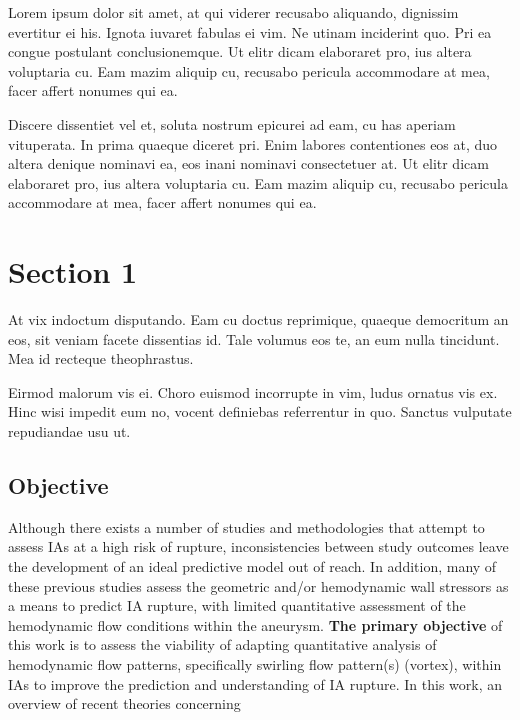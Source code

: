 Lorem ipsum dolor sit amet, at qui viderer recusabo aliquando, dignissim 
evertitur ei his. Ignota iuvaret fabulas ei vim. Ne utinam inciderint quo. 
Pri ea congue postulant conclusionemque. Ut elitr dicam elaboraret pro, ius 
altera voluptaria cu. Eam mazim aliquip cu, recusabo pericula accommodare at 
mea, facer affert nonumes qui ea.

Discere dissentiet vel et, soluta nostrum epicurei ad eam, cu has aperiam 
vituperata. In prima quaeque diceret pri. Enim labores contentiones eos at, 
duo altera denique nominavi ea, eos inani nominavi consectetuer at. Ut elitr 
dicam elaboraret pro, ius altera voluptaria cu. Eam mazim aliquip cu, 
recusabo pericula accommodare at mea, facer affert nonumes qui ea.
\cite{Crystal09_01,DMOL3_01,HPL_DGEMM_02}

\section{Section 1}\label{CHAPTER1_SECTION1}

At vix indoctum disputando. Eam cu doctus reprimique, quaeque democritum 
an eos, sit veniam facete dissentias id. Tale volumus eos te, an eum nulla 
tincidunt. Mea id recteque theophrastus.

Eirmod malorum vis ei. Choro euismod incorrupte in vim, ludus ornatus vis ex. 
Hinc wisi impedit eum no, vocent definiebas referrentur in quo. Sanctus 
vulputate repudiandae usu ut.

\subsection{Objective}\label{CHAPTER1_SECTION1_SUBSECTION1}

Although there exists a number of studies\cite{can2015association,zhou2017association,varble2018stroke} and methodologies\cite{etminan2015unruptured,greving2014development} that attempt to assess IAs at a high risk of rupture, inconsistencies between study outcomes leave the development of an ideal predictive model out of reach. In addition, many of these previous studies assess the geometric\cite{abboud2017morphology,kashiwazaki2013size,varble2018stroke} and/or hemodynamic wall stressors\cite{zhou2017association,Miura519,can2015association} as a means to predict IA rupture, with limited quantitative assessment of the hemodynamic flow conditions within the aneurysm. \textbf{The primary objective} of this work is to assess the viability of adapting quantitative analysis of hemodynamic flow patterns, specifically swirling flow pattern(s) (vortex), within IAs to improve the prediction and understanding of IA rupture. In this work, an overview of recent theories concerning 

